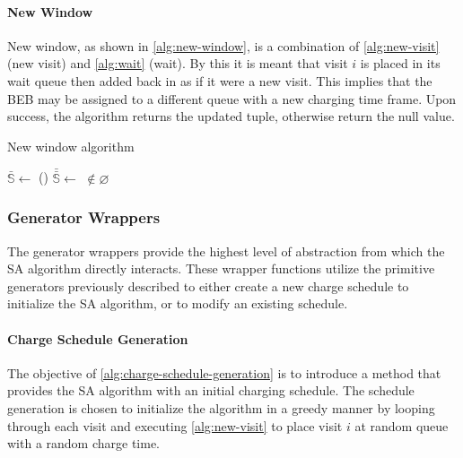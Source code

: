 \documentclass[ee,thesis]{usuthesis}
\newcommand{\Sol}{\mathbb{S}}               %
\begin{document}
\paragraph{New Window}
\label{sec:sa-new-window}
New window, as shown in \ref{alg:new-window}, is a combination of \ref{alg:new-visit} (new visit) and \ref{alg:wait}
(wait). By this it is meant that visit \(i\) is placed in its wait queue then added back in as if it were a new visit.
This implies that the BEB may be assigned to a different queue with a new charging time frame. Upon success, the
algorithm returns the updated tuple, otherwise return the null value.

\begin{algorithm}[H]
  \scriptsize
  \caption{New window algorithm} \label{alg:new-window}
  \LinesNumbered
  \KwIn{$\Sol$}
  \KwOut{$\bar{\Sol}$}


  \Begin
  {
    $\bar{\Sol} \leftarrow$\Wait{$\Sol$}
    \If()
       {
         $\bar{\bar{\Sol}} \leftarrow$ \NewVisit{$\bar{\Sol}$} $\not\in \varnothing$
       }
       {
         \Return{$\bar{\bar{\Sol}}$} 
       }

       \Return{($\varnothing$)}
  }
\end{algorithm}

\subsubsection{Generator Wrappers}
\label{sec:sa-generator-wrappers}
The generator wrappers provide the highest level of abstraction from which the SA algorithm directly interacts. These
wrapper functions utilize the primitive generators previously described to either create a new charge schedule to
initialize the SA algorithm, or to modify an existing schedule.

\paragraph{Charge Schedule Generation}
\label{sec:sa-charge-schedule-generation}
The objective of \ref{alg:charge-schedule-generation} is to introduce a method that provides the SA algorithm with an
initial charging schedule. The schedule generation is chosen to initialize the algorithm in a greedy manner by looping
through each visit and executing \ref{alg:new-visit} to place visit \(i\) at random queue with a random charge time.
\end{document}
